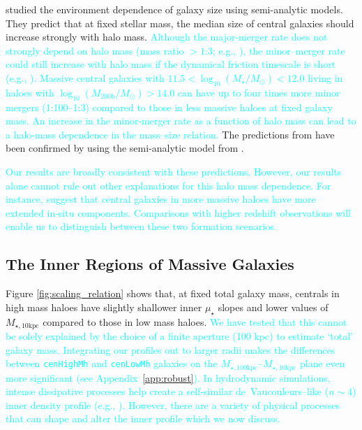 \documentclass[a4paper,fleqn,usenatbib]{mnras}
\def\rbcg{\texttt{cenHighMh}}
\def\nbcg{\texttt{cenLowMh}}
\def\logms{{$\log_{10} (M_{\star}/M_{\odot})$}}
\def\logmh{{$\log_{10} (M_{\mathrm{200b}}/M_{\odot})$}}
\def\minn{{$M_{\star,10\mathrm{kpc}}$}}
\def\mtot{{$M_{\star,100\mathrm{kpc}}$}}
\def\mden{{$\mu_{\star}$}}
\newcommand{\song}[1]{\textcolor{cyan}{#1}}
\begin{document}
    \citet{Shankar2014} studied the environment dependence of galaxy size using 
    semi-analytic models. 
    They predict that at fixed stellar mass, the median size of central galaxies 
    should increase strongly with halo mass. 
    \song{
    Although the major-merger rate does not strongly depend on halo mass 
    (mass ratio $>1$:3; e.g., \citealt{Hirschmann2013, Shankar2015}), the 
    minor--merger rate could still increase with halo mass if the dynamical friction
    timescale is short (e.g., \citealt{Newman2012}). 
    Massive central galaxies with $11.5 <$\logms{}$<12.0$ living in haloes with 
    \logmh{}$>14.0$ can have up to four times more minor mergers (1:100--1:3) compared 
    to those in less massive haloes at fixed galaxy mass. 
    An increase in the minor-merger rate as a function of halo mass can lead to a 
    halo-mass dependence in the mass--size relation. 
    }
    The predictions from \citet{Shankar2014} have been confirmed by \citet{Yoon2017} 
    using the semi-analytic model from \citet{Guo2011}.  
    
    \song{
    Our results are broadly consistent with these predictions. 
    However, our results alone cannot rule out other explanations for this halo mass 
    dependence. 
    For instance, \citet{Buchan2016} suggest that central galaxies in more massive 
    haloes have more extended in-situ components. 
    Comparisons with higher redshift observations will enable us to distinguish 
    between these two formation scenarios.
    }
   
\subsection{The Inner Regions of Massive Galaxies}

    Figure \ref{fig:scaling_relation} shows that, at fixed total galaxy mass, centrals 
    in high mass haloes have slightly shallower inner \mden{} slopes and lower values 
    of \minn{} compared to those in low mass haloes. 
    \song{
    We have tested that this cannot be solely explained by the choice of a finite 
    aperture (100 kpc) to estimate `total' galaxy mass. 
    Integrating our profiles out to larger radii makes the differences between \rbcg{} 
    and \nbcg{} galaxies on the \mtot{}--\minn{} plane even more significant 
    (see Appendix~\ref{app:robust}). 
    In hydrodynamic simulations, intense dissipative processes help create a 
    self-similar de~Vaucouleurs--like ($n{\sim} 4$) inner density profile 
    (e.g., \citealt{Hopkins2008}). 
    However, there are a variety of physical processes that can shape and alter the 
    inner  profile which we now discuss.
    } 
    
\end{document}
